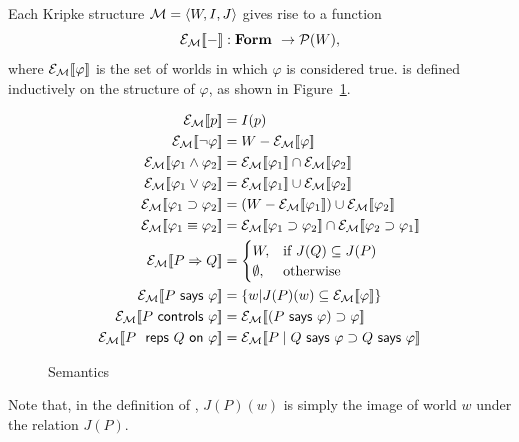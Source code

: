 \begin{definition}
  Each Kripke structure $\mathcal{M} = \langle {W,I,J} \rangle$ gives rise to a
  function 
  \[ \mathcal{E}_{\mathcal{M}}[\![-]\!]: \textbf{Form } \rightarrow \mathcal{P}(W), \]
  where $\mathcal{E}_{\mathcal{M}}[\![\varphi]\!]$ is the set of worlds in which $\varphi$ is
  considered true.
%
  \E{\varphi} is defined inductively on the structure of $\varphi$, as
  shown in Figure~\ref{fig:semantics}.

  \begin{figure}[tb]
    \centering
    \begin{minipage}[h]{0.7\linewidth}
    \begin{center}
    \begin{small}
    \begin{align*}
      \E{p}       & = I(p)\\
      \E{\neg \varphi} & = W - \E{\varphi}\\
      \E{\varphi_1 \wedge \varphi_2} & = \E{\varphi_1} \cap
      \E{\varphi_2}\\
      \E{\varphi_1 \vee \varphi_2} & = \E{\varphi_1} \cup \E{\varphi_2}\\
      \E{\varphi_1 \implies \varphi_2} & = (W - \E{\varphi_1}) \cup
      \E{\varphi_2} \\
      \E{\varphi_1 \equiv \varphi_2} & = \E{\varphi_1 \implies
        \varphi_2} \cap \E{\varphi_2 \implies \varphi_1} \\
      \E{P \speaksfor Q} &= 
      \begin{cases}
        W, & \text{if $J(Q) \subseteq J(P)$} \\
        \emptyset, & \text{otherwise}
      \end{cases} \\
      \E{P \says \varphi} & = \{w | J(P)(w) \subseteq \E{\varphi}\} \\
      \E{P \controls \varphi} & = \E{(P \says \varphi) \implies \varphi}
      \\
      \E{\reps{P}{Q}{\varphi}} & = \E{P \quoting Q \says \varphi \implies Q
        \says \varphi}
    \end{align*}\vspace*{-0.3in}
    \end{small}
    \end{center}
    \end{minipage}

    \caption{Semantics}
    \label{fig:semantics}
  \end{figure}

Note that, in the definition of , $J(P)(w)$ is simply
the image of world $w$ under the relation $J(P)$.
\end{definition}


